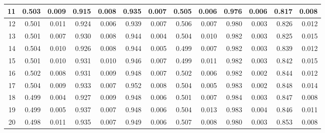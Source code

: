 \documentclass[
]{article}
\begin{document}
\begin{table}[H]
{\begin{tabular}{r|r|r|r|r|r|r|r|r|r|r|r|r}
\hline
11 & 0.503 & 0.009 & 0.915 & 0.008 & 0.935 & 0.007 & 0.505 & 0.006 & 0.976 & 0.006 & 0.817 & 0.008\\
\hline
12 & 0.501 & 0.011 & 0.924 & 0.006 & 0.939 & 0.007 & 0.506 & 0.007 & 0.980 & 0.003 & 0.826 & 0.012\\
\hline
13 & 0.501 & 0.007 & 0.930 & 0.008 & 0.944 & 0.004 & 0.504 & 0.010 & 0.982 & 0.003 & 0.825 & 0.015\\
\hline
14 & 0.504 & 0.010 & 0.926 & 0.008 & 0.944 & 0.005 & 0.499 & 0.007 & 0.982 & 0.003 & 0.839 & 0.012\\
\hline
15 & 0.501 & 0.010 & 0.931 & 0.010 & 0.946 & 0.007 & 0.499 & 0.011 & 0.982 & 0.003 & 0.842 & 0.015\\
\hline
16 & 0.502 & 0.008 & 0.931 & 0.009 & 0.948 & 0.007 & 0.502 & 0.006 & 0.982 & 0.002 & 0.844 & 0.012\\
\hline
17 & 0.504 & 0.009 & 0.933 & 0.007 & 0.952 & 0.008 & 0.504 & 0.005 & 0.983 & 0.002 & 0.848 & 0.014\\
\hline
18 & 0.499 & 0.004 & 0.927 & 0.009 & 0.948 & 0.006 & 0.501 & 0.007 & 0.984 & 0.003 & 0.847 & 0.008\\
\hline
19 & 0.499 & 0.005 & 0.937 & 0.007 & 0.948 & 0.006 & 0.504 & 0.013 & 0.983 & 0.004 & 0.846 & 0.011\\
\hline
20 & 0.498 & 0.011 & 0.935 & 0.007 & 0.949 & 0.006 & 0.507 & 0.008 & 0.980 & 0.003 & 0.853 & 0.008\\
\hline
\end{tabular}}\begin{table}
\centering
{}
\end{table}
\end{table}
\end{document}
